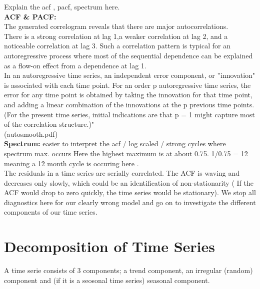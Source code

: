 \documentclass[11pt, a4paper]{article} %
\begin{document}
Explain the acf , pacf, spectrum here. \\
\textbf{ACF \& PACF:}\\
\noindent The generated correlogram reveals that there are major autocorrelations. \\
There is a strong correlation at lag 1,a weaker correlation at lag 2, and a noticeable correlation at lag 3. Such a correlation pattern is typical for an autoregressive process where most of the sequential dependence can be explained as a flow-on effect from a dependence at lag 1.\\
\noindent In an autoregressive time series, an independent error component, or ''innovation" is associated with each time point. For an order p autoregressive time series, the error for any time point is obtained by taking the innovation for that time point, and adding a linear combination of the innovations at the p previous time points. (For the present time series, initial indications are that p = 1 might capture most of the correlation structure.)"\\ (autosmooth.pdf)\\
\noindent \textbf{Spectrum:} easier to interpret the acf / log scaled / strong cycles where spectrum max. occurs
Here the highest maximum is at about 0.75. 1/0.75 = 12 meaning a 12 month cycle is occuring here .\\
\noindent The residuals in a time series are serially correlated. The ACF is waving and decreases only slowly, which could be an identification of non-stationarity ( If the ACF would drop to zero quickly, the time series would be stationary). We stop all diagnostics here for our clearly wrong model and go on to investigate the different components of our time series.\\
\section{Decomposition of Time Series}%
A time serie consists of 3 components; a trend component, an irregular (random) component and (if it is a seosonal time series) seasonal component.
\end{document}
